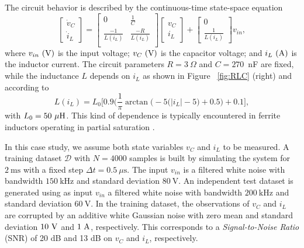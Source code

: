 \documentclass{article} %
\newcommand{\Did}{{\mathcal{D}}}
\begin{document}
The circuit behavior is described by the continuous-time state-space equation 
\begin{equation}
\label{eq:RLC_sys}
\begin{bmatrix}
\dot v_C\\
\dot i_L
\end{bmatrix} = 
\begin{bmatrix}
  0           & \tfrac{1}{C}\\
 \tfrac{-1}{L(i_L)} & \tfrac{-R}{L(i_L)}\\
\end{bmatrix}
\begin{bmatrix}
v_C\\
i_L
\end{bmatrix} +
\begin{bmatrix}
0\\
\tfrac{1}{L(i_L)}
\end{bmatrix} 
v_{in},
\end{equation}
where $v_{in}~\rm(V)$ is the input voltage; $v_C~\rm(V)$ is the capacitor voltage; and $i_L~\rm(A)$ is the inductor current. 
The circuit parameters $R=3~\Omega$ and $C=270$~nF are fixed, while the inductance $L$ depends on $i_L$ as shown in Figure~ \ref{fig:RLC} (right) and according to
\begin{equation*}
 L(i_L) = L_0\bigg[0.9\bigg(\frac{1}{\pi}\arctan\big(-\!5(|i_L|-5\big) + 0.5\bigg) + 0.1 \bigg], 
\end{equation*}
with $L_0=50~{\mu \rm  H}$. This kind of dependence  is typically encountered in ferrite inductors 
operating in partial saturation \citep{dicapua:2017ferrite}.

In this case study, we assume both state variables $v_C$ and $i_L$ to be measured. 
A training dataset $\Did$ with $N=4000$ samples  is built by  %
simulating the system for  $2~\text{ms}$ with a fixed step $\Delta t=0.5~\mu \text{s}$.  The input $v_{in}$ is a filtered white noise with bandwidth $150~\text{kHz}$ and standard deviation $80~\text{V}$. An independent test dataset is generated using as input $v_{in}$ a filtered white noise   with  bandwidth $200~\text{kHz}$ and standard deviation $60~\text{V}$. 
In the training dataset, the observations of $v_C$ and $i_L$ are corrupted by an additive white Gaussian noise with zero mean and standard deviation $10~\rm V$ and $1~\rm A$, respectively. This corresponds to a \emph{Signal-to-Noise Ratio} (SNR) of  20 dB and 13 dB on  $v_C$ and $i_L$, respectively.  
\end{document}
